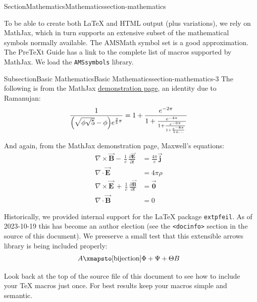 \documentclass[twoside,10pt,]{article}
\newcommand{\mono}[1]{\texttt{#1}}
\numberwithin{equation}{section}
\begin{document}
\begin{sectionptx}{Section}{Mathematics}{}{Mathematics}{}{}{section-mathematics}
\begin{introduction}{}%
To be able to create both \LaTeX{} and HTML output (plus variations), we rely on MathJax, which in turn supports an extensive subset of the mathematical symbols normally available.  The AMSMath symbol set is a good approximation.  The PreTeXt Guide has a link to the complete list of macros supported by MathJax.  We load the \mono{AMSsymbols} library.%
\end{introduction}%
%
%
\typeout{************************************************}
\typeout{************************************************}
%
\begin{subsectionptx}{Subsection}{Basic Mathematics}{}{Basic Mathematics}{}{}{section-mathematics-3}
The following is from the MathJax \href{http://www.mathjax.org/demos/tex-samples/}{demonstration page}, an identity due to Ramanujan:%
\begin{equation*}
\frac{1}{\Bigl(\sqrt{\phi \sqrt{5}}-\phi\Bigr) e^{\frac25 \pi}} = 1+\frac{e^{-2\pi}} {1+\frac{e^{-4\pi}} {1+\frac{e^{-6\pi}} {1+\frac{e^{-8\pi}} {1+\ldots} } } }
\end{equation*}
%
\par
And again, from the MathJax demonstration page, Maxwell's equations:%
\begin{align*}
\nabla \times \vec{\mathbf{B}} -\, \frac1c\, \frac{\partial\vec{\mathbf{E}}}{\partial t} & = \frac{4\pi}{c}\vec{\mathbf{j}}\\
\nabla \cdot \vec{\mathbf{E}} & = 4 \pi \rho\\
\nabla \times \vec{\mathbf{E}}\, +\, \frac1c\, \frac{\partial\vec{\mathbf{B}}}{\partial t} & = \vec{\mathbf{0}}\\
\nabla \cdot \vec{\mathbf{B}} & = 0
\end{align*}
\label{section-mathematics-3-3-3}%
\par
Historically, we provided internal support for the \LaTeX{} package \mono{extpfeil}.  As of 2023-10-19 this has become an author election (see the \mono{<docinfo>} section in the source of this document).  We preeserve a small test that this extensible arrows library is being included properly:%
\begin{equation*}
A\xmapsto[\text{bijection}]{\Phi+\Psi+\Theta}B
\end{equation*}
%
\par
Look back at the top of the source file of this document to see how to include your \TeX{} macros just once.  For best results keep your macros simple and semantic.%

\end{subsectionptx}
\end{sectionptx}
\end{document}
